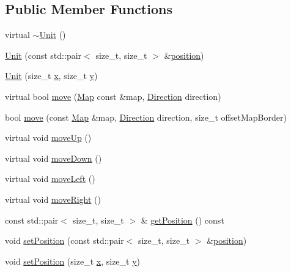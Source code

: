 \subsection*{Public Member Functions}
\begin{DoxyCompactItemize}
\item 
virtual \hyperlink{classarcade_1_1_unit_a44236fd92c37b80c2fda5356d8b6ec81}{$\sim$\+Unit} ()
\item 
\hyperlink{classarcade_1_1_unit_a34cb0964152e5039495031ec7be15613}{Unit} (const std\+::pair$<$ size\+\_\+t, size\+\_\+t $>$ \&\hyperlink{classarcade_1_1_unit_ab56f7df422277f97e7738cb4807fd62d}{position})
\item 
\hyperlink{classarcade_1_1_unit_abf639f95e434f9920cb6a342784e8d4e}{Unit} (size\+\_\+t \hyperlink{include_2_protocol_8hpp_a4dde988b1b2adba65ae3efa69f65d960}{x}, size\+\_\+t \hyperlink{include_2_protocol_8hpp_ab0580f504a7428539be299fa71565f30}{y})
\item 
virtual bool \hyperlink{classarcade_1_1_unit_a2a6a6feacea0fce220062be1115207b1}{move} (\hyperlink{classarcade_1_1_map}{Map} const \&map, \hyperlink{classarcade_1_1_unit_af418afeaba1f7fd5934b6ae1343215dd}{Direction} direction)
\item 
bool \hyperlink{classarcade_1_1_unit_a4a108f0a801a245f048366f787dcbe15}{move} (const \hyperlink{classarcade_1_1_map}{Map} \&map, \hyperlink{classarcade_1_1_unit_af418afeaba1f7fd5934b6ae1343215dd}{Direction} direction, size\+\_\+t offset\+Map\+Border)
\item 
virtual void \hyperlink{classarcade_1_1_unit_a59e206c30ea40c75f0a4e7165e510717}{move\+Up} ()
\item 
virtual void \hyperlink{classarcade_1_1_unit_a2c308fe563d0851f2a275694c9b0dc6c}{move\+Down} ()
\item 
virtual void \hyperlink{classarcade_1_1_unit_a17f28a5a98e7c24e8c1ea13897220d89}{move\+Left} ()
\item 
virtual void \hyperlink{classarcade_1_1_unit_a58ef633f19e9fe137006e8cdd3fb7d29}{move\+Right} ()
\item 
const std\+::pair$<$ size\+\_\+t, size\+\_\+t $>$ \& \hyperlink{classarcade_1_1_unit_a6ab43e77e961dc4192687ea730dd7712}{get\+Position} () const
\item 
void \hyperlink{classarcade_1_1_unit_ab53d6d5f92e49bfe5f500307e299599d}{set\+Position} (const std\+::pair$<$ size\+\_\+t, size\+\_\+t $>$ \&\hyperlink{classarcade_1_1_unit_ab56f7df422277f97e7738cb4807fd62d}{position})
\item 
void \hyperlink{classarcade_1_1_unit_a5b6beb5c96e174caf0ba0f0d14ccde8b}{set\+Position} (size\+\_\+t \hyperlink{include_2_protocol_8hpp_a4dde988b1b2adba65ae3efa69f65d960}{x}, size\+\_\+t \hyperlink{include_2_protocol_8hpp_ab0580f504a7428539be299fa71565f30}{y})

\end{DoxyCompactItemize}
